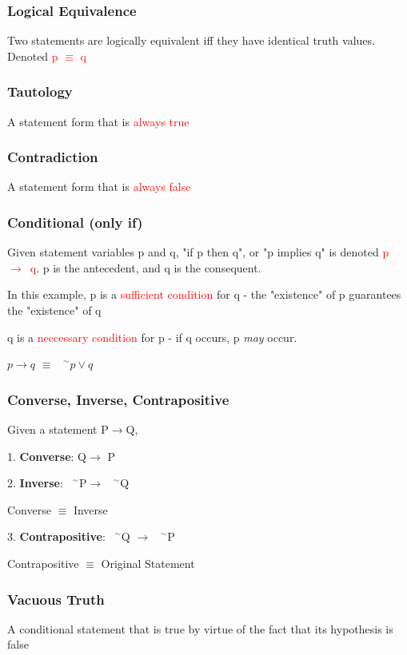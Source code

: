 \documentclass{article}
\newcommand{\negation}{${\phantom{0}}^\sim$}
\newcommand{\sbreak}{\vspace{10pt}}
\begin{document}
\subsubsection{Logical Equivalence}
Two statements are logically equivalent iff they have identical truth values. Denoted \textcolor{red}{p $\equiv$ q}
\subsubsection{Tautology}
A statement form that is \textcolor{red}{always true}
\subsubsection{Contradiction}
A statement form that is \textcolor{red}{always false}
\subsubsection{Conditional (only if)}
Given statement variables p and q, "if p then q", or "p implies q" is denoted \mbox{\textcolor{red}{p $\rightarrow$ q}}. p is the antecedent, and q is the consequent.

In this example, p is a \textcolor{red}{sufficient condition} for q - the "existence" of p guarantees the "existence" of q

q is a \textcolor{red}{neccessary condition} for p - if q occurs, p \textit{may} occur.

\sbreak
\begin{center}
    $p\rightarrow q$ $\equiv$ \negation$p \vee q$
\end{center}

\subsubsection{Converse, Inverse, Contrapositive}
Given a statement P$\rightarrow$Q,

1. \textbf{Converse}:
Q$ \rightarrow$ P

2. \textbf{Inverse}:
\negation P$\rightarrow$ \negation Q

Converse $\equiv$ Inverse

\vspace{10pt}

3. \textbf{Contrapositive}:
\negation Q $\rightarrow$ \negation P

Contrapositive $\equiv$ Original Statement


\subsubsection{Vacuous Truth}
A conditional statement that is true by virtue of the fact that its hypothesis is false
\end{document}
